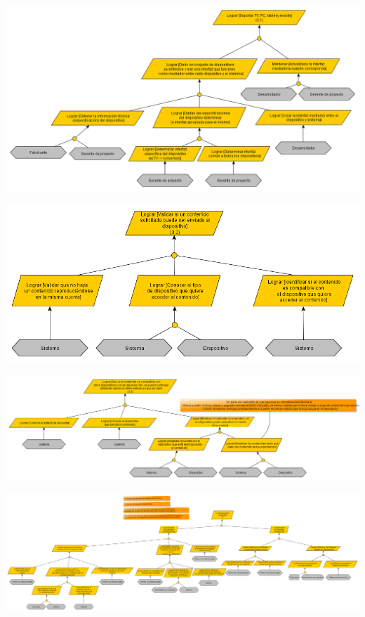 \documentclass[11pt, a4paper, spanish]{article}
\begin{document}
\newpage
	\begin{center}
		\includegraphics[scale=0.60, angle=90]{Diagramas/3-1ModelodeObjetivosTransparencia.png}
	\end{center}
\newpage
	\begin{center}
		\includegraphics[scale=0.65, angle=90]{Diagramas/3-2ModelodeObjetivosTransparencia.png}
	\end{center}
\newpage
	\begin{center}
		\includegraphics[scale=0.45, angle=90]{Diagramas/3-3ModelodeObjetivosTransparencia.png}
	\end{center}
\newpage
	\begin{center}
		\includegraphics[scale=0.28, angle=90]{Diagramas/4ModelodeObjetivosCalidaddecontenidos.png}
	\end{center}
\newpage
\end{document}
